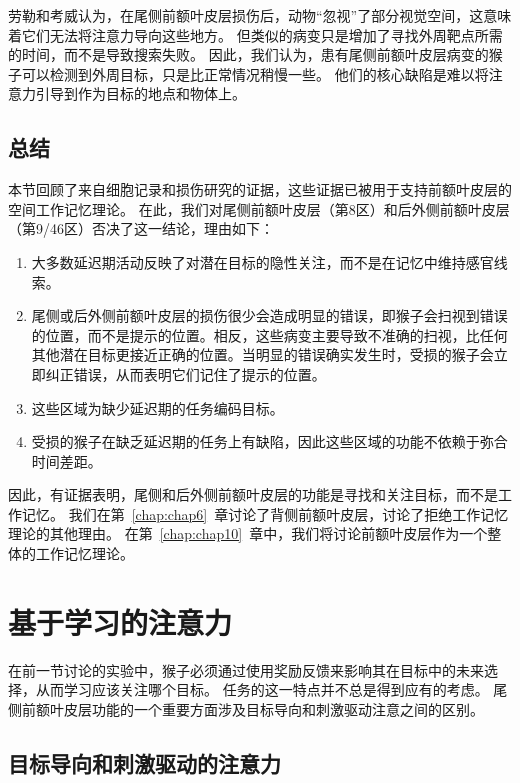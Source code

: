 劳勒和考威\cite{lawler1987role}认为，在尾侧前额叶皮层损伤后，动物“忽视”了部分视觉空间，这意味着它们无法将注意力导向这些地方。
但类似的病变只是增加了寻找外周靶点所需的时间，而不是导致搜索失败\cite{wardak2004deficit}。
因此，我们认为，患有尾侧前额叶皮层病变的猴子可以检测到外周目标，只是比正常情况稍慢一些。
他们的核心缺陷是难以将注意力引导到作为目标的地点和物体上。



\subsection{总结}

本节回顾了来自细胞记录和损伤研究的证据，这些证据已被用于支持前额叶皮层的空间工作记忆理论\cite{goldman1996prefrontal}。
在此，我们对尾侧前额叶皮层（第8区）和后外侧前额叶皮层（第9/46区）否决了这一结论，理由如下：


\begin{enumerate}
	\item 大多数延迟期活动反映了对潜在目标的隐性关注，而不是在记忆中维持感官线索。
	\item 尾侧或后外侧前额叶皮层的损伤很少会造成明显的错误，即猴子会扫视到错误的位置，而不是提示的位置。相反，这些病变主要导致不准确的扫视，比任何其他潜在目标更接近正确的位置。当明显的错误确实发生时，受损的猴子会立即纠正错误，从而表明它们记住了提示的位置。
	\item 这些区域为缺少延迟期的任务编码目标。
	\item 受损的猴子在缺乏延迟期的任务上有缺陷，因此这些区域的功能不依赖于弥合时间差距。
\end{enumerate}
因此，有证据表明，尾侧和后外侧前额叶皮层的功能是寻找和关注目标，而不是工作记忆。
我们在第~\ref{chap:chap6}~章讨论了背侧前额叶皮层，讨论了拒绝工作记忆理论的其他理由。
在第~\ref{chap:chap10}~章中，我们将讨论前额叶皮层作为一个整体的工作记忆理论。



\section{基于学习的注意力}

在前一节讨论的实验中，猴子必须通过使用奖励反馈来影响其在目标中的未来选择，从而学习应该关注哪个目标。
任务的这一特点并不总是得到应有的考虑。
尾侧前额叶皮层功能的一个重要方面涉及目标导向和刺激驱动注意之间的区别。


\subsection{目标导向和刺激驱动的注意力}

